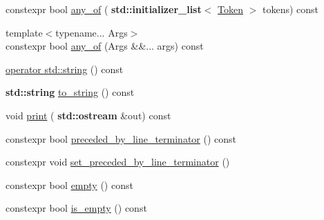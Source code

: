 \begin{DoxyCompactItemize}
constexpr bool \hyperlink{class_token_a0aeba20251cf6afb5f9deee77bc10e2c}{any\+\_\+of} (\textbf{ std\+::initializer\+\_\+list}$<$ \hyperlink{class_token}{Token} $>$ tokens) const
\item 
{\footnotesize template$<$typename... Args$>$ }\\constexpr bool \hyperlink{class_token_a154f07c45f704f530fcf5b0ef2eaeeef}{any\+\_\+of} (Args \&\&... args) const
\item 
\hyperlink{class_token_a37a03ca940a3abaec1491c9306bafa2a}{operator std\+::string} () const
\item 
\textbf{ std\+::string} \hyperlink{class_token_a602aa1415de3415044205333495e72f5}{to\+\_\+string} () const
\item 
void \hyperlink{class_token_ae3e466fdaf072ec89d2c4bf78b91d5e9}{print} (\textbf{ std\+::ostream} \&out) const
\item 
constexpr bool \hyperlink{class_token_aec736aba84de102878db8605f8574e38}{preceded\+\_\+by\+\_\+line\+\_\+terminator} () const
\item 
constexpr void \hyperlink{class_token_a1a3247e7cb73b8f7a5f03517163275e7}{set\+\_\+preceded\+\_\+by\+\_\+line\+\_\+terminator} ()
\item 
constexpr bool \hyperlink{class_token_aaed20163d2aee9be88f80f28ba7f9200}{empty} () const
\item 
constexpr bool \hyperlink{class_token_a9c8d38440d6d13ad1c8c943045e0a508}{is\+\_\+empty} () const
\end{DoxyCompactItemize}
